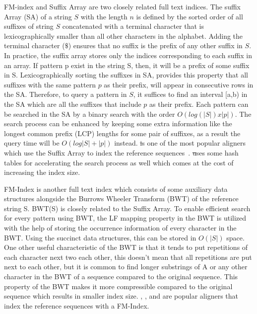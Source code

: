 FM-index and Suffix Array are two closely related full text indices. The suffix 
Array (SA) of a string $S$ with the length $n$ is defined by the sorted order of all 
suffixes of string $S$ concatenated with a terminal character that is 
lexicographically smaller than all other characters in the alphabet. 
Adding the terminal character ($\$$) ensures that no suffix is the prefix of any 
other suffix in $S$. In practice, the suffix array stores only the indices 
corresponding to each suffix in an array. If pattern p exist in the string S, 
then, it will be a prefix of some suffix in S. Lexicographically sorting the 
suffixes in SA, provides this property that all suffixes with the same 
pattern $p$ as their prefix, will appear in consecutive rows in the SA. Therefore, 
to query a pattern in $S$, it suffices to find an interval [a,b) in the SA which 
are all the suffixes that include $p$ as their prefix. Each pattern can be searched 
in the SA by a binary search with the order $O(log(|S|)x|p|)$. The search process can 
be enhanced by keeping some extra information like the longest common prefix 
(LCP) lengths for some pair of suffixes, as a result the query time will be 
$O(log|S|+|p|)$ instead. \st is one of the most popular aligners which use the 
Suffix Array to index the reference sequences~\citep{Dobin2013Star}. \st uses some hash tables 
for accelerating the search process as well which comes at the cost of increasing 
the index size.

FM-Index is another full text index which consists of some auxiliary 
data structures alongside the Burrows Wheeler Transform (BWT) of the reference 
string S. BWT(S) is closely related to the Suffix Array. To enable efficient 
search for every pattern using BWT, the LF mapping property in the BWT is 
utilized with the help of storing the occurrence information of every character 
in the BWT. Using the succinct data structures, this can be stored in $O(|S|)$ 
space. One other useful characteristic of the BWT is that it tends to put 
repetitions of each character next two each other, this doesn’t mean that all 
repetitions are put next to each other, but it is common to find longer 
substrings of A or any other character in the BWT of a sequence compared to the original sequence. 
This property of the BWT makes it more compressible compared to the original sequence which results in smaller index size. 
\btie, \bt, and \bwa are popular aligners that index the reference sequences with a FM-Index.

